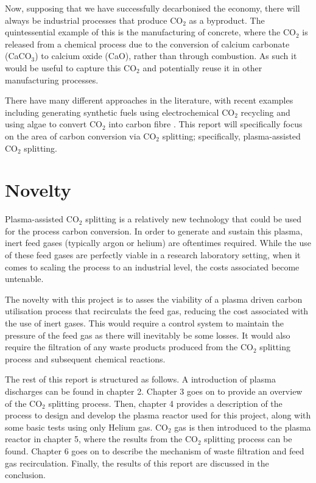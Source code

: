 Now, supposing that we have successfully decarbonised the economy, there will always be industrial processes that produce CO$_2$ as a byproduct. The quintessential example of this is the manufacturing of concrete, where the CO$_2$ is released from a chemical process due to the conversion of calcium carbonate (CaCO$_3$) to calcium oxide (CaO), rather than through combustion. As such it would be useful to capture this CO$_2$ and potentially reuse it in other manufacturing processes. 

There have many different approaches in the literature, with recent examples including generating synthetic fuels using electrochemical CO$_2$ recycling \cite{ross_et_al_2019} and using algae to convert CO$_2$ into carbon fibre \cite{arnold_et_al_2018}. This report will specifically focus on the area of carbon conversion via CO$_2$ splitting; specifically, plasma-assisted CO$_2$ splitting.


\section{Novelty}

Plasma-assisted CO$_2$ splitting is a relatively new technology that could be used for the process carbon conversion. In order to generate and sustain this plasma, inert feed gases (typically argon or helium) are oftentimes required. While the use of these feed gases are perfectly viable in a research laboratory setting, when it comes to scaling the process to an industrial level, the costs associated become untenable.

The novelty with this project is to asses the viability of a plasma driven carbon utilisation process that recirculats the feed gas, reducing the cost associated with the use of inert gases. This would require a control system to maintain the pressure of the feed gas as there will inevitably be some losses. It would also require the filtration of any waste products produced from the CO$_2$ splitting process and subsequent chemical reactions.

The rest of this report is structured as follows. A introduction of plasma discharges can be found in chapter 2. Chapter 3 goes on to provide an overview of the CO$_2$ splitting process. Then, chapter 4 provides a description of the process to design and develop the plasma reactor used for this project, along with some basic tests using only Helium gas. CO$_2$ gas is then introduced to the plasma reactor in chapter 5, where the results from the CO$_2$ splitting process can be found. Chapter 6 goes on to describe the mechanism of waste filtration and feed gas recirculation. Finally, the results of this report are discussed in the conclusion.
